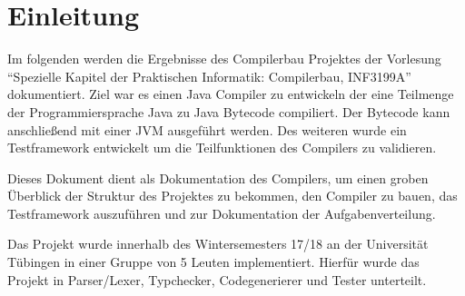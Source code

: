 \chapter{Einleitung}

Im folgenden werden die Ergebnisse des Compilerbau Projektes
der Vorlesung \enquote{Spezielle Kapitel der Praktischen Informatik: Compilerbau, INF3199A}
dokumentiert.
Ziel war es einen Java Compiler zu entwickeln der eine Teilmenge der Programmiersprache
Java \cite{aufgabenstellung} zu Java Bytecode\cite{bytecode} compiliert.
Der Bytecode kann anschließend mit einer \ac{JVM}\cite{jvm} ausgeführt werden.
Des weiteren wurde ein Testframework entwickelt um die Teilfunktionen
des Compilers zu validieren.

Dieses Dokument dient als Dokumentation des Compilers, um einen groben
Überblick der Struktur des Projektes zu bekommen, den Compiler zu bauen,
das Testframework auszuführen und zur Dokumentation der Aufgabenverteilung.

Das Projekt wurde innerhalb des Wintersemesters 17/18 an der Universität
Tübingen in einer Gruppe von 5 Leuten implementiert.
Hierfür wurde das Projekt in Parser/Lexer, Typchecker, Codegenerierer und Tester unterteilt.
